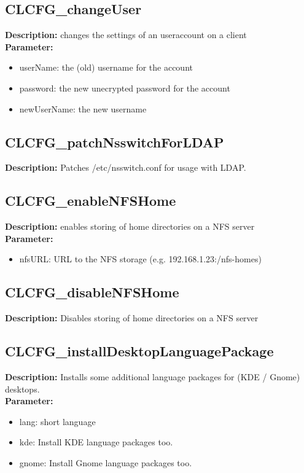 \subsection{CLCFG\_changeUser}
\textbf{Description:} changes the settings of an useraccount on a client\\
\textbf{Parameter:}
\begin{itemize}
\item userName: the (old) username for the account
\item password: the new unecrypted password for the account
\item newUserName: the new username
\end{itemize}

\subsection{CLCFG\_patchNsswitchForLDAP}
\textbf{Description:} Patches /etc/nsswitch.conf for usage with LDAP.\\

\subsection{CLCFG\_enableNFSHome}
\textbf{Description:} enables storing of home directories on a NFS server\\
\textbf{Parameter:}
\begin{itemize}
\item nfsURL: URL to the NFS storage (e.g. 192.168.1.23:/nfs-homes)
\end{itemize}

\subsection{CLCFG\_disableNFSHome}
\textbf{Description:} Disables storing of home directories on a NFS server\\

\subsection{CLCFG\_installDesktopLanguagePackage}
\textbf{Description:} Installs some additional language packages for (KDE / Gnome) desktops.\\
\textbf{Parameter:}
\begin{itemize}
\item lang: short language
\item kde: Install KDE language packages too.
\item gnome: Install Gnome language packages too.
\end{itemize}

